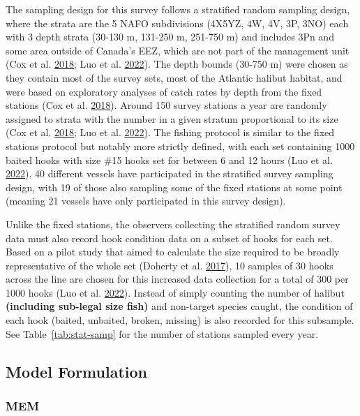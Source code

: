 \documentclass[12pt]{article}\usepackage[]{graphicx}\usepackage[]{color}
\begin{document}
The sampling design for this survey follows a stratified random sampling design, where the strata are the 5 NAFO subdivisions (4X5YZ, 4W, 4V, 3P, 3NO) each with 3 depth strata (30-130 m, 131-250 m, 251-750 m) and includes 3Pn and some area outside of Canada's EEZ, which are not part of the management unit (Cox et al. \protect\hyperlink{ref-Cox2018}{2018}; Luo et al. \protect\hyperlink{ref-Luo2022}{2022}). The depth bounds (30-750 m) were chosen as they contain most of the survey sets, most of the Atlantic halibut habitat, and were based on exploratory analyses of catch rates by depth from the fixed stations (Cox et al. \protect\hyperlink{ref-Cox2018}{2018}). Around 150 survey stations a year are randomly assigned to strata with the number in a given stratum proportional to its size (Cox et al. \protect\hyperlink{ref-Cox2018}{2018}; Luo et al. \protect\hyperlink{ref-Luo2022}{2022}). The fishing protocol is similar to the fixed stations protocol but notably more strictly defined, with each set containing 1000 baited hooks with size \#15 hooks set for between 6 and 12 hours (Luo et al. \protect\hyperlink{ref-Luo2022}{2022}). 40 different vessels have participated in the stratified survey sampling design, with 19 of those also sampling some of the fixed stations at some point (meaning 21 vessels have only participated in this survey design).

Unlike the fixed stations, the observers collecting the stratified random survey data must also record hook condition data on a subset of hooks for each set. Based on a pilot study that aimed to calculate the size required to be broadly representative of the whole set (Doherty et al. \protect\hyperlink{ref-Doherty2017}{2017}), 10 samples of 30 hooks across the line are chosen for this increased data collection for a total of 300 per 1000 hooks (Luo et al. \protect\hyperlink{ref-Luo2022}{2022}). Instead of simply counting the number of halibut \textbf{(including sub-legal size fish)} and non-target species caught, the condition of each hook (baited, unbaited, broken, missing) is also recorded for this subsample. See Table~\ref{tab:stat-samp} for the number of stations sampled every year.

\hypertarget{model-formulation}{%
\subsection{Model Formulation}\label{model-formulation}}

\hypertarget{mem}{%
\subsubsection{MEM}\label{mem}}
\end{document}
